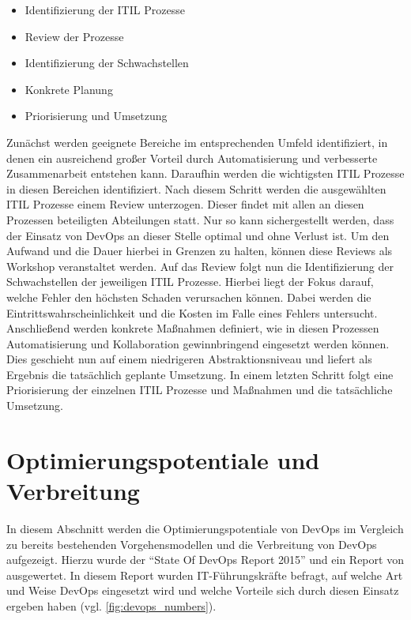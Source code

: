 \begin{itemize}
\item Identifizierung der ITIL Prozesse
\item Review der Prozesse
\item Identifizierung der Schwachstellen
\item Konkrete Planung
\item Priorisierung und Umsetzung
\end{itemize}

Zunächst werden geeignete Bereiche im entsprechenden Umfeld identifiziert, in denen ein ausreichend großer Vorteil durch Automatisierung und verbesserte Zusammenarbeit entstehen kann. 
Daraufhin werden die wichtigsten ITIL Prozesse in diesen Bereichen identifiziert. 
Nach diesem Schritt werden die ausgewählten ITIL Prozesse einem Review unterzogen. 
Dieser findet mit allen an diesen Prozessen beteiligten Abteilungen statt. 
Nur so kann sichergestellt werden, dass der Einsatz von DevOps an dieser Stelle optimal und ohne Verlust ist. 
Um den Aufwand und die Dauer hierbei in Grenzen zu halten, können diese Reviews als Workshop veranstaltet werden. 
Auf das Review folgt nun die Identifizierung der Schwachstellen der jeweiligen ITIL Prozesse. 
Hierbei liegt der Fokus darauf, welche Fehler den höchsten Schaden verursachen können. 
Dabei werden die Eintrittswahrscheinlichkeit und die Kosten im Falle eines Fehlers untersucht. 
Anschließend werden konkrete Maßnahmen definiert, wie in diesen Prozessen Automatisierung und Kollaboration gewinnbringend eingesetzt werden können. 
Dies geschieht nun auf einem niedrigeren Abstraktionsniveau und liefert als Ergebnis die tatsächlich geplante Umsetzung. 
In einem letzten Schritt folgt eine Priorisierung der einzelnen ITIL Prozesse und Maßnahmen und die tatsächliche Umsetzung. 
\parencite[Vgl.][S. 1 - 3]{Sharp-Paul:2016}

\section{Optimierungspotentiale und Verbreitung} \label{sec:optimierung} %
In diesem Abschnitt werden die Optimierungspotentiale von DevOps im Vergleich zu bereits bestehenden Vorgehensmodellen und die Verbreitung von DevOps aufgezeigt. 
Hierzu wurde der \enquote{State Of DevOps Report 2015} \parencite[][]{DevOpsSODR:2015} und ein Report von \parencite[][]{Gartner:2015} ausgewertet. 
In diesem Report wurden IT-Führungskräfte befragt, auf welche Art und Weise DevOps eingesetzt wird und welche Vorteile sich durch diesen Einsatz ergeben haben (vgl. \autoref{fig:devops_numbers}).

